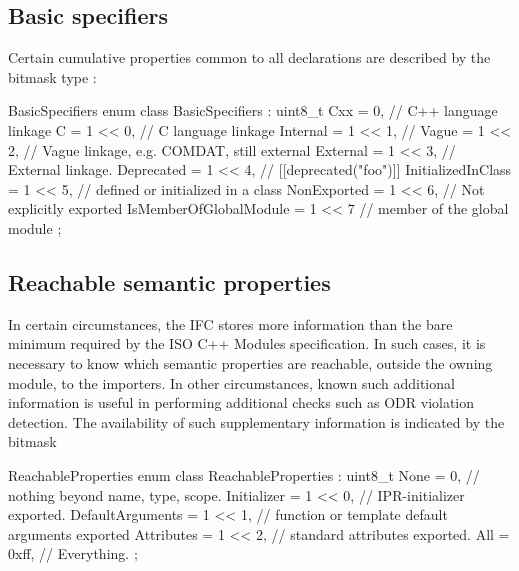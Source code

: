 \subsection{Basic specifiers}
\label{sec:ifc-basic-specifiers}

Certain cumulative properties common to all declarations are described by the bitmask type :
%
\begin{typedef}{BasicSpecifiers}{}
	enum class BasicSpecifiers : uint8_t {
		Cxx                     = 0,        // C++ language linkage
		C                       = 1 << 0,   // C language linkage
		Internal                = 1 << 1,   // 
		Vague                   = 1 << 2,   // Vague linkage, e.g. COMDAT, still external
		External                = 1 << 3,   // External linkage.
		Deprecated              = 1 << 4,   // [[deprecated("foo")]]
		InitializedInClass      = 1 << 5,   // defined or initialized in a class
		NonExported             = 1 << 6,   // Not explicitly exported
		IsMemberOfGlobalModule  = 1 << 7    // member of the global module
	};
\end{typedef}
%


\subsection{Reachable semantic properties}
\label{sec:ifc-reachable-properties}

In certain circumstances, the IFC stores more information than the bare minimum
required by the ISO C++ Modules specification.  In such cases, it is necessary to know 
which semantic properties are reachable, outside the owning module, to the importers.
In other circumstances, known such additional information is useful in performing
additional checks such as ODR violation detection.  The availability of such
supplementary information is indicated by the bitmask 
\begin{typedef}{ReachableProperties}{}
    enum class ReachableProperties : uint8_t {
        None                = 0,        // nothing beyond name, type, scope.
        Initializer         = 1 << 0,   // IPR-initializer exported.
        DefaultArguments    = 1 << 1,   // function or template default arguments exported
        Attributes          = 1 << 2,   // standard attributes exported.
        All                 = 0xff,     // Everything.
    };
\end{typedef}
%



